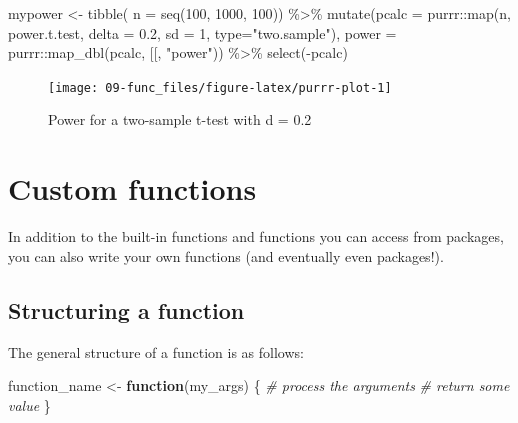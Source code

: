 \documentclass[
  oneside]{book}
\newenvironment{Shaded}{\begin{snugshade}}{\end{snugshade}}
\newcommand{\AttributeTok}[1]{\textcolor[rgb]{0.77,0.63,0.00}{#1}}
\newcommand{\CommentTok}[1]{\textcolor[rgb]{0.56,0.35,0.01}{\textit{#1}}}
\newcommand{\ControlFlowTok}[1]{\textcolor[rgb]{0.13,0.29,0.53}{\textbf{#1}}}
\newcommand{\DecValTok}[1]{\textcolor[rgb]{0.00,0.00,0.81}{#1}}
\newcommand{\FloatTok}[1]{\textcolor[rgb]{0.00,0.00,0.81}{#1}}
\newcommand{\FunctionTok}[1]{\textcolor[rgb]{0.00,0.00,0.00}{#1}}
\newcommand{\NormalTok}[1]{#1}
\newcommand{\OtherTok}[1]{\textcolor[rgb]{0.56,0.35,0.01}{#1}}
\newcommand{\SpecialCharTok}[1]{\textcolor[rgb]{0.00,0.00,0.00}{#1}}
\newcommand{\StringTok}[1]{\textcolor[rgb]{0.31,0.60,0.02}{#1}}
\begin{document}
\begin{Shaded}
\begin{Highlighting}[]
\NormalTok{mypower }\OtherTok{\textless{}{-}} \FunctionTok{tibble}\NormalTok{(}
  \AttributeTok{n =} \FunctionTok{seq}\NormalTok{(}\DecValTok{100}\NormalTok{, }\DecValTok{1000}\NormalTok{, }\DecValTok{100}\NormalTok{)) }\SpecialCharTok{\%\textgreater{}\%}
  \FunctionTok{mutate}\NormalTok{(}\AttributeTok{pcalc =}\NormalTok{ purrr}\SpecialCharTok{::}\FunctionTok{map}\NormalTok{(n, power.t.test, }
                            \AttributeTok{delta =} \FloatTok{0.2}\NormalTok{, }
                            \AttributeTok{sd =} \DecValTok{1}\NormalTok{, }
                            \AttributeTok{type=}\StringTok{"two.sample"}\NormalTok{),}
         \AttributeTok{power =}\NormalTok{ purrr}\SpecialCharTok{::}\FunctionTok{map\_dbl}\NormalTok{(pcalc, }\StringTok{\textasciigrave{}}\AttributeTok{[[}\StringTok{\textasciigrave{}}\NormalTok{, }\StringTok{"power"}\NormalTok{)) }\SpecialCharTok{\%\textgreater{}\%}
  \FunctionTok{select}\NormalTok{(}\SpecialCharTok{{-}}\NormalTok{pcalc)}
\end{Highlighting}
\end{Shaded}

\begin{figure}

{\centering \texttt{[image: 09-func\_files/figure-latex/purrr-plot-1]} 

}

\caption{Power for a two-sample t-test with d = 0.2}\label{fig:purrr-plot}
\end{figure}

\hypertarget{custom-functions}{%
\section{Custom functions}\label{custom-functions}}

In addition to the built-in functions and functions you can access from packages, you can also write your own functions (and eventually even packages!).

\hypertarget{structure-function}{%
\subsection{Structuring a function}\label{structure-function}}

The general structure of a function is as follows:

\begin{Shaded}
\begin{Highlighting}[]
\NormalTok{function\_name }\OtherTok{\textless{}{-}} \ControlFlowTok{function}\NormalTok{(my\_args) \{}
  \CommentTok{\# process the arguments}
  \CommentTok{\# return some value}
\NormalTok{\}}
\end{Highlighting}
\end{Shaded}
\end{document}
